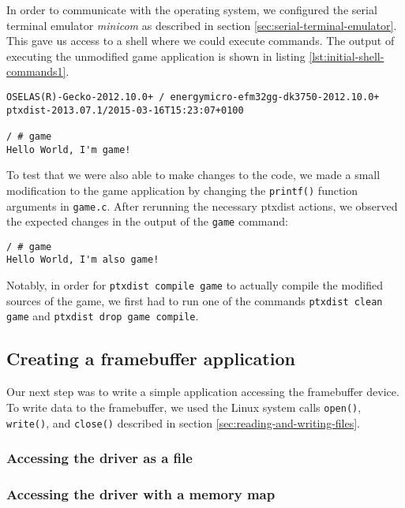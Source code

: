 In order to communicate with the operating system, we configured the serial terminal emulator \emph{minicom} as described in section \ref{sec:serial-terminal-emulator}. This gave us access to a shell where we could execute commands. The output of executing the unmodified game application is shown in listing \ref{lst:initial-shell-commands1}.
\lstset{style=lststyle-terminal}
\begin{lstlisting}[caption=Executing the unmodified game,label=lst:initial-shell-commands1]
OSELAS(R)-Gecko-2012.10.0+ / energymicro-efm32gg-dk3750-2012.10.0+
ptxdist-2013.07.1/2015-03-16T15:23:07+0100

/ # game
Hello World, I'm game!
\end{lstlisting}

To test that we were also able to make changes to the code, we made a small modification to the game application by changing the \texttt{printf()} function arguments in \texttt{game.c}. After rerunning the necessary ptxdist actions, we observed the expected changes in the output of the \texttt{game} command:
\lstset{style=lststyle-terminal}
\begin{lstlisting}[caption=Executing a slightly modified game,label=lst:initial-shell-commands2]
/ # game
Hello World, I'm also game!
\end{lstlisting}
Notably, in order for \texttt{ptxdist compile game} to actually compile the modified sources of the game, we first had to run one of the commands \texttt{ptxdist clean game} and \texttt{ptxdist drop game compile}.

\subsection{Creating a framebuffer application}
Our next step was to write a simple application accessing the framebuffer device. To write data to the framebuffer, we used the Linux system calls \texttt{open()}, \texttt{write()}, and \texttt{close()} described in section \ref{sec:reading-and-writing-files}.


\subsubsection{Accessing the driver as a file}

\subsubsection{Accessing the driver with a memory map}



